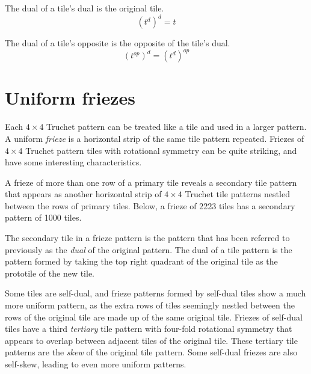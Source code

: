 \documentclass{tufte-book}
\begin{document}
\begin{theorem}
The dual of a tile's dual is the original tile. 
$$(t^d)^d = t$$
\end{theorem}

\begin{theorem}
The dual of a tile's opposite is the opposite of the tile's dual. 
$$(t^{op})^d = (t^d)^{op}$$
\end{theorem}


\newpage


\chapter{Uniform friezes}

\noindent
Each $4\times 4$ Truchet pattern can be treated like a tile and used in a larger pattern. A uniform \textit{frieze} is a horizontal strip of the same tile pattern repeated. Friezes of $4\times 4$ Truchet pattern tiles with rotational symmetry can be quite striking, and have some interesting characteristics. 

\vspace{0.5cm}
\noindent
A frieze of more than one row of a primary tile reveals a secondary tile pattern that appears as another horizontal strip of $4\times 4$ Truchet tile patterns nestled between the rows of primary tiles. Below, a frieze of 2223 tiles has a secondary pattern of 1000 tiles.
\,

\vspace{0.5cm}


\vspace{0.5cm}
\noindent
The secondary tile in a frieze pattern is the pattern that has been referred to previously as the \textit{dual} of the original pattern. The dual of a tile pattern is the pattern formed by taking the top right quadrant of the original tile as the prototile of the new tile.

\vspace{0.5cm}
\noindent
Some tiles are self-dual, and frieze patterns formed by self-dual tiles show a much more uniform pattern, as the extra rows of tiles seemingly nestled between the rows of the original tile are made up of the same original tile. Friezes of self-dual tiles have a third \textit{tertiary} tile pattern with four-fold rotational symmetry that appears to overlap between adjacent tiles of the original tile. These tertiary tile patterns are the \textit{skew} of the original tile pattern. Some self-dual friezes are also self-skew, leading to even more uniform patterns.
\end{document}
